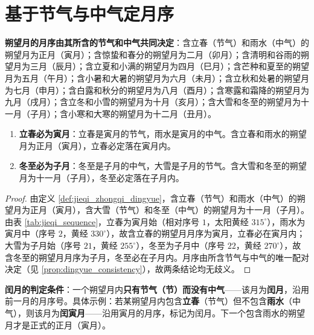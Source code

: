 \section{基于节气与中气定月序}
\label{sec:dingyue}

\begin{definition}[节气与中气定月序规则]\label{def:jieqi_zhongqi_dingyue}
\textbf{朔望月的月序由其所含的节气和中气共同决定}：含立春（节气）和雨水（中气）的朔望月为正月（寅月）；含惊蛰和春分的朔望月为二月（卯月）；含清明和谷雨的朔望月为三月（辰月）；含立夏和小满的朔望月为四月（巳月）；含芒种和夏至的朔望月为五月（午月）；含小暑和大暑的朔望月为六月（未月）；含立秋和处暑的朔望月为七月（申月）；含白露和秋分的朔望月为八月（酉月）；含寒露和霜降的朔望月为九月（戌月）；含立冬和小雪的朔望月为十月（亥月）；含大雪和冬至的朔望月为十一月（子月）；含小寒和大寒的朔望月为十二月（丑月）。
\end{definition}

\begin{theorem}\label{thm:lichun_yinyue_dongzhi_haiyue}
\begin{enumerate}[label=(\roman*)]
    \item \textbf{立春必为寅月}：立春是寅月的节气，雨水是寅月的中气。含立春和雨水的朔望月为正月（寅月），立春必定落在寅月内。
    \item \textbf{冬至必为子月}：冬至是子月的中气，大雪是子月的节气。含大雪和冬至的朔望月为十一月（子月），冬至必定落在子月内。
\end{enumerate}
\end{theorem}

\begin{proof}
由定义 \ref{def:jieqi_zhongqi_dingyue}，含立春（节气）和雨水（中气）的朔望月为正月（寅月），含大雪（节气）和冬至（中气）的朔望月为十一月（子月）。由表 \ref{tab:jieqi_sequence}，立春为寅月始（相对序号 \(1\)，太阳黄经 \(315^\circ\)），雨水为寅月中（序号 \(2\)，黄经 \(330^\circ\)），故含立春的朔望月月序为寅月，立春必在寅月内；大雪为子月始（序号 \(21\)，黄经 \(255^\circ\)），冬至为子月中（序号 \(22\)，黄经 \(270^\circ\)），故含冬至的朔望月月序为子月，冬至必在子月内。月序由所含节气与中气的唯一配对决定（见 \cref{prop:dingyue_consistency}），故两条结论均无歧义。
\end{proof}

\begin{proposition}[只有节气没有中气的朔望月为闰月]\label{prop:wuzhongqi_run}
\textbf{闰月的判定条件}：一个朔望月内\textbf{只有节气（节）而没有中气}——该月为\textbf{闰月}，沿用前一月的月序号。具体示例：若某朔望月内包含\textbf{立春}（节气）但不包含\textbf{雨水}（中气），则该月为\textbf{闰寅月}——沿用寅月的月序，标记为闰月。下一个包含雨水的朔望月才是正式的正月（寅月）。
\end{proposition}

